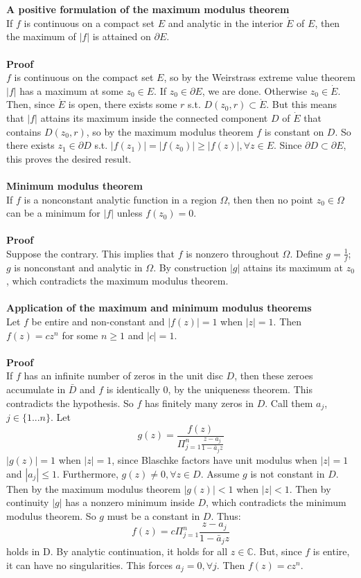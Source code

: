 \documentclass[12 pt]{article}
\begin{document}
\\
\\
\textbf{A positive formulation of the maximum modulus theorem}
\\
If $f$ is continuous on a compact set $E$ and analytic in the interior $\dot E$ of $E$, then the maximum of $|f|$ is attained on $\partial E$.
\\
\\
\textbf{Proof}
\\
$f$ is continuous on the compact set $E$, so by the Weirstrass extreme value theorem $|f|$ has a maximum at some $z_0\in E$. If $z_0\in \partial E$, we are done. Otherwise $z_0\in \dot E$. Then, since $\dot E$ is open, there exists some $r$ s.t. $D(z_0, r) \subset \dot E$. But this means that $|f|$ attains its maximum inside the connected component $D$ of $\dot E$ that contains $D(z_0, r)$, so by the maximum modulus theorem $f$ is constant on $D$. So there exists $z_1\in \partial D$ s.t. $|f(z_1)|=|f(z_0)|\geq |f(z)| , \forall z \in E$. Since $\partial D \subset \partial E$, this proves the desired result.
\\
\\
\textbf{Minimum modulus theorem}
\\
If $f$ is a nonconstant analytic function in a region $\Omega$, then then no point $z_0\in \Omega$ can be a minimum for $|f|$ unless $f(z_0) = 0$.
\\
\\
\textbf{Proof}
\\
Suppose the contrary. This implies that $f$ is nonzero throughout $\Omega$. Define $g = \frac{1}{f}$; $g$ is nonconstant and analytic in $\Omega$. By construction $|g|$ attains its maximum at $z_0$, which contradicts the maximum modulus theorem.
\\
\\
\textbf{Application of the maximum and minimum modulus theorems}
\\
Let $f$ be entire and non-constant and $|f(z)| = 1$ when $|z| = 1$. Then $f(z) = cz^{n}$ for some $n\geq 1$ and $|c|=1$.
\\
\\
\textbf{Proof}
\\
If $f$ has an infinite number of zeros in the unit disc $D$, then these zeroes accumulate in $\bar D$ and $f$ is identically 0, by the uniqueness theorem. This contradicts the hypothesis. So $f$ has finitely many zeros in $D$. Call them $a_j$, $j\in \{1...n\}$. Let
\[ g(z) = \frac{f(z)}{\Pi^{n}_{j=1} \frac{z-a_j}{1-\bar a_j z} } \]
$|g(z)| = 1$ when $|z|=1$, since Blaschke factors have unit modulus when $|z| = 1$ and $|a_j|\leq 1$. Furthermore, $g(z)\neq 0, \forall z\in D$. Assume $g$ is not constant in $D$. Then by the maximum modulus theorem $|g(z)|<1$ when $|z|<1$. Then by continuity $|g|$ has a nonzero minimum inside $D$, which contradicts the minimum modulus theorem. So $g$ must be a constant in $D$. Thus:
\[ f(z) = c\Pi^{n}_{j=1} \frac{z-a_j}{1-\bar a_j z} \]
holds in D. By analytic continuation, it holds for all $z\in \mathbb{C}$. But, since $f$ is entire, it can have no singularities. This forces $a_{j}=0, \forall j$. Then $f(z) = c z^{n}$.
\end{document}
